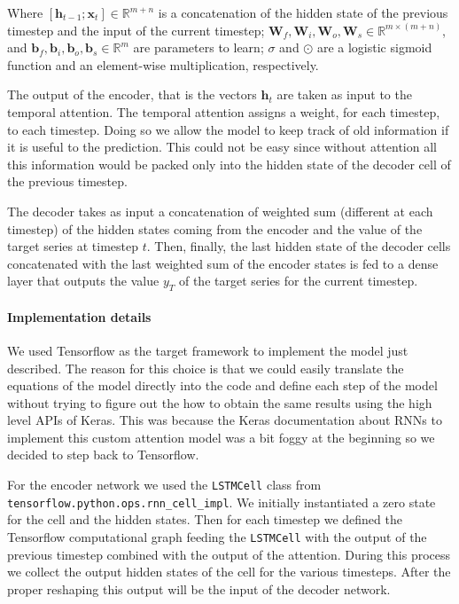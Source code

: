 \documentclass{article}
\begin{document}
Where $[\mathbf{h}_{t-1};\mathbf{x}_t] \in \mathbb{R}^{m + n}$ is a concatenation of the hidden state of the previous 
timestep and the input of the current timestep; $\mathbf{W}_f,\mathbf{W}_i,\mathbf{W}_o,\mathbf{W}_s 
\in \mathbb{R}^{m \times(m+n)}$, and $\mathbf{b}_f, \mathbf{b}_i, \mathbf{b}_o,\mathbf{b}_s \in \mathbb{R}^m$ are 
parameters to learn; $\sigma$ and $\odot$ are a logistic sigmoid function and an element-wise multiplication,
respectively.

The output of the encoder, that is the vectors $\mathbf{h}_t$ are taken as input to the temporal attention.
The temporal attention assigns a weight, for each timestep, to each timestep. Doing so we allow the model to keep
track of old information if it is useful to the prediction. This could not be easy since without attention all this 
information would be packed only into the hidden state of the decoder cell of the previous timestep.

The decoder takes as input a concatenation of weighted sum (different at each timestep) of the hidden states coming 
from the encoder and the value of the target series at timestep $t$. Then, finally, the last hidden state of the decoder
cells concatenated with the last weighted sum of the encoder states is fed to a dense layer that outputs the value 
$y_T$ of the target series for the current timestep.

\paragraph{Implementation details}

We used Tensorflow as the target framework to implement the model just described. The reason for this choice is that we
could easily translate the equations of the model directly into the code and define each step of the model without 
trying to figure out the how to obtain the same results using the high level APIs of Keras. This was because the 
Keras documentation about RNNs to implement this custom attention model was a bit foggy at the beginning so we decided
to step back to Tensorflow. 

For the encoder network we used the \texttt{LSTMCell} class from \texttt{tensorflow.python.ops.rnn\_cell\_impl}.
We initially instantiated a zero state for the cell and the hidden states. Then for each timestep we defined the 
Tensorflow computational graph feeding the \texttt{LSTMCell} with the output of the previous timestep combined with the
output of the attention. During this process we collect the output hidden states of the cell for the various timesteps.
After the proper reshaping this output will be the input of the decoder network.
\end{document}

